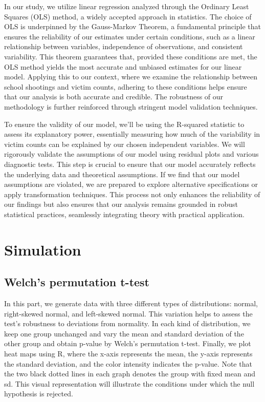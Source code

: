 \documentclass[12pt]{article}
\numberwithin{figure}{section}
\begin{document}
In our study, we utilize linear regression analyzed through the Ordinary Least Squares (OLS) method, a widely accepted approach in statistics. The choice of OLS is underpinned by the Gauss-Markov Theorem, a fundamental principle that ensures the reliability of our estimates under certain conditions, such as a linear relationship between variables, independence of observations, and consistent variability. This theorem guarantees that, provided these conditions are met, the OLS method yields the most accurate and unbiased estimates for our linear model. Applying this to our context, where we examine the relationship between school shootings and victim counts, adhering to these conditions helps ensure that our analysis is both accurate and credible. The robustness of our methodology is further reinforced through stringent model validation techniques.

To ensure the validity of our model, we'll be using the R-squared statistic to assess its explanatory power, essentially measuring how much of the variability in victim counts can be explained by our chosen independent variables. We will rigorously validate the assumptions of our model using residual plots and various diagnostic tests. This step is crucial to ensure that our model accurately reflects the underlying data and theoretical assumptions. If we find that our model assumptions are violated, we are prepared to explore alternative specifications or apply transformation techniques. This process not only enhances the reliability of our findings but also ensures that our analysis remains grounded in robust statistical practices, seamlessly integrating theory with practical application.

\section{Simulation}

\subsection{Welch’s permutation t-test}

In this part, we generate data with three different types of distributions: normal, right-skewed normal, and left-skewed normal. This variation helps to assess the test's robustness to deviations from normality. In each kind of distribution, we keep one group unchanged and vary the mean and standard deviation of the other group and obtain p-value by Welch’s permutation t-test. Finally, we plot heat maps using R, where the x-axis represents the mean, the y-axis represents the standard deviation, and the color intensity indicates the p-value. Note that the two black dotted lines in each graph denotes the group with fixed mean and sd. This visual representation will illustrate the conditions under which the null hypothesis is rejected.
\end{document}
